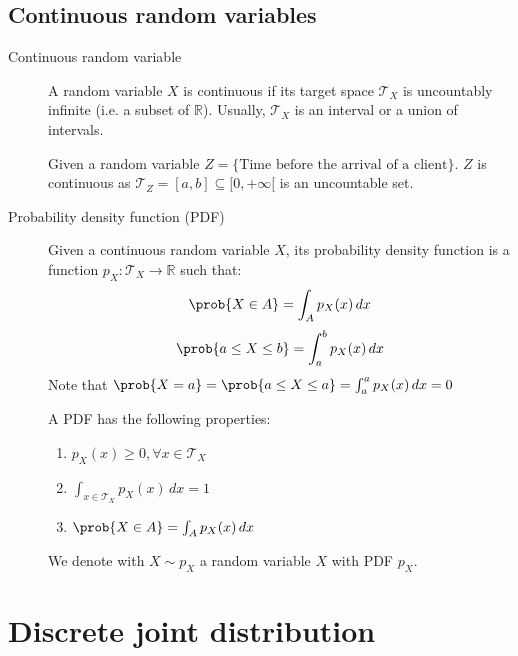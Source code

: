 \subsection{Continuous random variables}

\begin{description}
    \item[Continuous random variable] 
        A random variable $X$ is continuous if its target space $\mathcal{T}_X$ is uncountably infinite (i.e. a subset of $\mathbb{R}$).
        Usually, $\mathcal{T}_X$ is an interval or a union of intervals.

        \begin{example}
            Given a random variable $Z = \{ \text{Time before the arrival of a client} \}$.
            $Z$ is continuous as $\mathcal{T}_Z = [a, b] \subseteq [0, +\infty[$ is an uncountable set.
        \end{example}

    \item[Probability density function (PDF)] 
        Given a continuous random variable $X$, 
        its probability density function is a function $p_X: \mathcal{T}_X \rightarrow \mathbb{R}$ such that:
        \[ \prob{X \in A} = \int_{A} p_X(x) \,dx \]
        \[ \prob{a \leq X \leq b} = \int_{a}^{b} p_X(x) \,dx \]
        Note that $\prob{X = a} = \prob{a \leq X \leq a} = \int_{a}^{a} p_X(x) \,dx = 0$

        A PDF has the following properties:
        \begin{enumerate}
            \item $p_X(x) \geq 0, \forall x \in \mathcal{T}_X$ 
            \item $\int_{x \in  \mathcal{T}_X} p_X(x) \,dx = 1$
            \item $\prob{X \in A} =  \int_{A} p_X(x) \,dx$
        \end{enumerate}

        We denote with $X \sim p_X$ a random variable $X$ with PDF $p_X$.
    \end{description}



\section{Discrete joint distribution}

